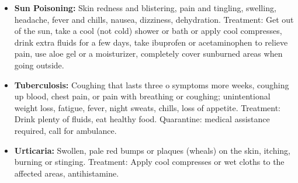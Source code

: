 \begin{itemize}
\item \textbf{Sun Poisoning:} Skin redness and blistering, pain and tingling, swelling, headache, fever and chills, nausea, dizziness, dehydration. Treatment: Get out of the sun, take a cool (not cold) shower or bath or apply cool compresses, drink extra fluids for a few days, take ibuprofen or acetaminophen to relieve pain, use aloe gel or a moisturizer, completely cover sunburned areas when going outside.

\item \textbf{Tuberculosis:} Coughing that lasts three o symptoms more weeks, coughing up blood, chest pain, or pain with breathing or coughing; unintentional weight loss, fatigue, fever, night sweats, chills, loss of appetite. Treatment: Drink plenty of fluids, eat healthy food. Quarantine: medical assistance required, call for ambulance.

\item \textbf{Urticaria:} Swollen, pale red bumps or plaques (wheals) on the skin, itching, burning or stinging. Treatment: Apply cool compresses or wet cloths to the affected areas, antihistamine.

\end{itemize}


